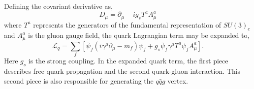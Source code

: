 Defining the covariant derivative as,
\begin{equation}
    D_\mu = \partial_\mu - ig_sT^aA_\mu^a
\end{equation}
where $T^a$ represents the generators of the fundamental representation of $SU(3)_c$ and $A_\mu^a$ is the gluon 
gauge field, the quark Lagrangian term may be expanded to,
\begin{equation}
    \mathcal L_q = \sum_f\left[\bar\psi_f\!\left(i\gamma^\mu\partial_\mu-m_f\right)\psi_f+g_s\bar\psi_f\gamma^\mu T^a\psi_f A_\mu^a\right].
\end{equation}
Here $g_s$ is the strong coupling. In the expanded quark term, the first piece 
describes free quark propagation and the second quark-gluon interaction. This second 
piece is also responsible for generating the $q\bar qg$ vertex. 

